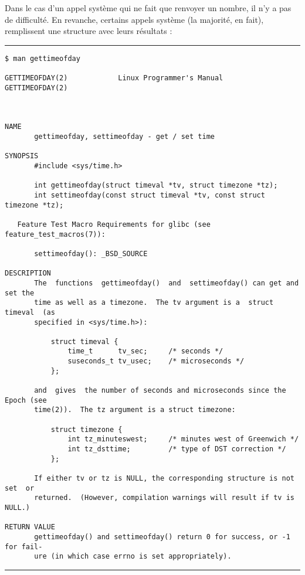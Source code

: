 
\cite{intelsys}

Dans le cas d'un appel système qui ne fait que renvoyer un nombre, il n'y a pas
de difficulté. En revanche, certains appels système (la majorité, en fait),
remplissent une structure avec leurs résultats :

\begin{center}\rule{3in}{0.4pt}\end{center}

\begin{verbatim}
$ man gettimeofday

GETTIMEOFDAY(2)            Linux Programmer's Manual           GETTIMEOFDAY(2)



NAME
       gettimeofday, settimeofday - get / set time

SYNOPSIS
       #include <sys/time.h>

       int gettimeofday(struct timeval *tv, struct timezone *tz);
       int settimeofday(const struct timeval *tv, const struct timezone *tz);

   Feature Test Macro Requirements for glibc (see feature_test_macros(7)):

       settimeofday(): _BSD_SOURCE

DESCRIPTION
       The  functions  gettimeofday()  and  settimeofday() can get and set the
       time as well as a timezone.  The tv argument is a  struct  timeval  (as
       specified in <sys/time.h>):

           struct timeval {
               time_t      tv_sec;     /* seconds */
               suseconds_t tv_usec;    /* microseconds */
           };

       and  gives  the number of seconds and microseconds since the Epoch (see
       time(2)).  The tz argument is a struct timezone:

           struct timezone {
               int tz_minuteswest;     /* minutes west of Greenwich */
               int tz_dsttime;         /* type of DST correction */
           };

       If either tv or tz is NULL, the corresponding structure is not  set  or
       returned.  (However, compilation warnings will result if tv is NULL.)

RETURN VALUE
       gettimeofday() and settimeofday() return 0 for success, or -1 for fail‐
       ure (in which case errno is set appropriately).
\end{verbatim}
\begin{center}\rule{3in}{0.4pt}\end{center}

